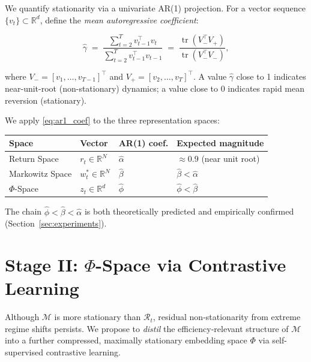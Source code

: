 \documentclass[12pt, a4paper]{report}
\theoremstyle{plain}
\theoremstyle{definition}
\newcommand{\R}{\mathbb{R}}
\newcommand{\calM}{\mathcal{M}}
\newcommand{\calR}{\mathcal{R}}
\DeclareMathOperator{\tr}{tr}
\begin{document}
We quantify stationarity via a univariate AR(1) projection.  For a vector
sequence $\{v_t\} \subset \R^d$, define the \emph{mean autoregressive coefficient}:

\begin{equation}
  \hat{\gamma} \;=\;
  \frac{\sum_{t=2}^T v_{t-1}^\top v_t}
       {\sum_{t=2}^T v_{t-1}^\top v_{t-1}}
  \;=\;
  \frac{\tr(V_{-}^\top V_{+})}{\tr(V_{-}^\top V_{-})},
  \label{eq:ar1_coef}
\end{equation}

where $V_{-} = [v_1,\dots,v_{T-1}]^\top$ and $V_{+} = [v_2,\dots,v_T]^\top$.
A value $\hat{\gamma}$ close to 1 indicates near-unit-root (non-stationary)
dynamics; a value close to 0 indicates rapid mean reversion (stationary).

We apply \eqref{eq:ar1_coef} to the three representation spaces:

\begin{center}
\renewcommand{\arraystretch}{1.4}
\begin{tabular}{llll}
\toprule
\textbf{Space} & \textbf{Vector} & \textbf{AR(1) coef.} & \textbf{Expected magnitude}\\
\midrule
Return Space  & $r_t \in \R^N$   & $\hat{\alpha}$ & $\approx 0.9$ (near unit root)\\
Markowitz Space & $w_t^* \in \R^N$ & $\hat{\beta}$  & $\hat{\beta} < \hat{\alpha}$\\
$\Phi$-Space  & $z_t \in \R^d$   & $\hat{\phi}$   & $\hat{\phi} < \hat{\beta}$\\
\bottomrule
\end{tabular}
\end{center}

The chain $\hat{\phi} < \hat{\beta} < \hat{\alpha}$ is both theoretically predicted
and empirically confirmed (Section~\ref{sec:experiments}).

\section{Stage II: \texorpdfstring{$\Phi$}{Phi}-Space via Contrastive Learning}
\label{sec:phi_space}

Although $\calM$ is more stationary than $\calR_t$, residual non-stationarity
from extreme regime shifts persists.  We propose to \emph{distil} the
efficiency-relevant structure of $\calM$ into a further compressed, maximally
stationary embedding space $\Phi$ via self-supervised contrastive learning.
\end{document}
